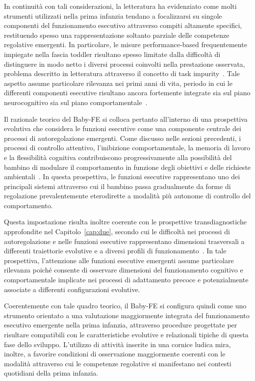             In continuità con tali considerazioni, la letteratura ha evidenziato come molti strumenti utilizzati nella prima infanzia tendano a focalizzarsi su singole componenti del funzionamento esecutivo attraverso compiti altamente specifici, restituendo spesso una rappresentazione soltanto parziale delle competenze regolative emergenti. In particolare, le misure performance-based frequentemente impiegate nella fascia toddler risultano spesso limitate dalla difficoltà di distinguere in modo netto i diversi processi coinvolti nella prestazione osservata, problema descritto in letteratura attraverso il concetto di task impurity~\cite{miyake2000,friedman2017}. Tale aspetto assume particolare rilevanza nei primi anni di vita, periodo in cui le differenti componenti esecutive risultano ancora fortemente integrate sia sul piano neurocognitivo sia sul piano comportamentale~\cite{garon2008}.

            Il razionale teorico del Baby-FE si colloca pertanto all'interno di una prospettiva evolutiva che considera le funzioni esecutive come una componente centrale dei processi di autoregolazione emergenti. Come discusso nelle sezioni precedenti, i processi di controllo attentivo, l'inibizione comportamentale, la memoria di lavoro e la flessibilità cognitiva contribuiscono progressivamente alla possibilità del bambino di modulare il comportamento in funzione degli obiettivi e delle richieste ambientali~\cite{diamond2013,zelazo2003}. In questa prospettiva, le funzioni esecutive rappresentano uno dei principali sistemi attraverso cui il bambino passa gradualmente da forme di regolazione prevalentemente eterodirette a modalità più autonome di controllo del comportamento.

            Questa impostazione risulta inoltre coerente con le prospettive transdiagnostiche approfondite nel Capitolo~\ref{cap:due}, secondo cui le difficoltà nei processi di autoregolazione e nelle funzioni esecutive rappresentano dimensioni trasversali a differenti traiettorie evolutive e a diversi profili di funzionamento~\cite{beauchaine2013mcnulty,astle2022}. In tale prospettiva, l'attenzione alle funzioni esecutive emergenti assume particolare rilevanza poiché consente di osservare dimensioni del funzionamento cognitivo e comportamentale implicate nei processi di adattamento precoce e potenzialmente associate a differenti configurazioni evolutive.

            Coerentemente con tale quadro teorico, il Baby-FE si configura quindi come uno strumento orientato a una valutazione maggiormente integrata del funzionamento esecutivo emergente nella prima infanzia, attraverso procedure progettate per risultare compatibili con le caratteristiche evolutive e relazionali tipiche di questa fase dello sviluppo. L'utilizzo di attività inserite in una cornice ludica mira, inoltre, a favorire condizioni di osservazione maggiormente coerenti con le modalità attraverso cui le competenze regolative si manifestano nei contesti quotidiani della prima infanzia.

